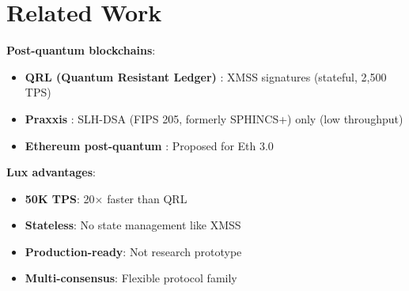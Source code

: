 \section{Related Work}


\textbf{Post-quantum blockchains}:
\begin{itemize}
    \item \textbf{QRL (Quantum Resistant Ledger)} \cite{qrl2018}: XMSS signatures (stateful, 2,500 TPS)
    \item \textbf{Praxxis} \cite{praxxis2020}: SLH-DSA (FIPS 205, formerly SPHINCS+) only (low throughput)
    \item \textbf{Ethereum post-quantum} \cite{ethereum2023}: Proposed for Eth 3.0
\end{itemize}

\textbf{Lux advantages}:
\begin{itemize}
    \item \textbf{50K TPS}: 20$\times$ faster than QRL
    \item \textbf{Stateless}: No state management like XMSS
    \item \textbf{Production-ready}: Not research prototype
    \item \textbf{Multi-consensus}: Flexible protocol family
\end{itemize}


